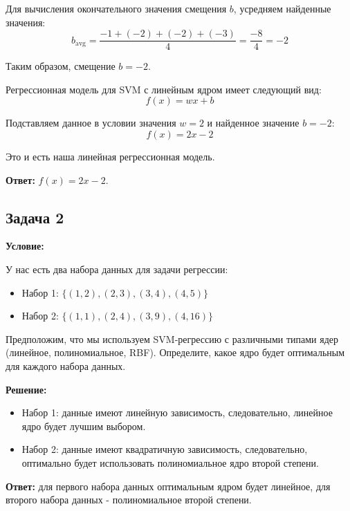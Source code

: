 \par Для вычисления окончательного значения смещения \(b\), усредняем найденные значения:
\begin{equation*}
    b_{\text{avg}} = \frac{-1 + (-2) + (-2) + (-3)}{4} = \frac{-8}{4} = -2
\end{equation*}
\par Таким образом, смещение \(b = -2\).
\par Регрессионная модель для SVM с линейным ядром имеет следующий вид:
\begin{equation*}
    f(x) = w x + b
\end{equation*}
\par Подставляем данное в условии значения \(w = 2\) и найденное значение \(b = -2\):
\begin{equation*}
    f(x) = 2x - 2
\end{equation*}
\par Это и есть наша линейная регрессионная модель.
\par \noindent \textbf{Ответ:} \(f(x) = 2x - 2\).

\subsection{Задача 2}
\textbf{Условие:}
\par У нас есть два набора данных для задачи регрессии:
\begin{itemize}
    \item Набор 1: \( \{(1, 2), (2, 3), (3, 4), (4, 5)\} \)    
    \item Набор 2: \( \{(1, 1), (2, 4), (3, 9), (4, 16)\} \)  
\end{itemize}
\par Предположим, что мы используем SVM-регрессию с различными типами ядер (линейное, полиномиальное, RBF). Определите, какое ядро будет оптимальным для каждого набора данных.
\par \noindent \textbf{Решение:}
\begin{itemize}
    \item Набор 1: данные имеют линейную зависимость, следовательно, линейное ядро будет лучшим выбором.

    \item Набор 2: данные имеют квадратичную зависимость, следовательно, оптимально будет использовать полиномиальное ядро второй степени.
\end{itemize}
\par \noindent \textbf{Ответ:} для первого набора данных оптимальным ядром будет линейное, для второго набора данных - полиномиальное второй степени.

